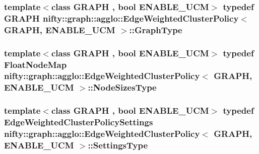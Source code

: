 \subsubsection[{Graph\+Type}]{\setlength{\rightskip}{0pt plus 5cm}template$<$class G\+R\+A\+P\+H , bool E\+N\+A\+B\+L\+E\+\_\+\+U\+C\+M$>$ typedef G\+R\+A\+P\+H {\bf nifty\+::graph\+::agglo\+::\+Edge\+Weighted\+Cluster\+Policy}$<$ G\+R\+A\+P\+H, E\+N\+A\+B\+L\+E\+\_\+\+U\+C\+M $>$\+::{\bf Graph\+Type}}\label{classnifty_1_1graph_1_1agglo_1_1EdgeWeightedClusterPolicy_a8e910f7b9d0c1baa1de7b6b1c3e58397}
\hypertarget{classnifty_1_1graph_1_1agglo_1_1EdgeWeightedClusterPolicy_a44ba54059efcb57c8c8091016fb9ee99}{}
\subsubsection[{Node\+Sizes\+Type}]{\setlength{\rightskip}{0pt plus 5cm}template$<$class G\+R\+A\+P\+H , bool E\+N\+A\+B\+L\+E\+\_\+\+U\+C\+M$>$ typedef Float\+Node\+Map {\bf nifty\+::graph\+::agglo\+::\+Edge\+Weighted\+Cluster\+Policy}$<$ G\+R\+A\+P\+H, E\+N\+A\+B\+L\+E\+\_\+\+U\+C\+M $>$\+::{\bf Node\+Sizes\+Type}}\label{classnifty_1_1graph_1_1agglo_1_1EdgeWeightedClusterPolicy_a44ba54059efcb57c8c8091016fb9ee99}
\hypertarget{classnifty_1_1graph_1_1agglo_1_1EdgeWeightedClusterPolicy_a6c9e2acec086a9fcc4391f067a4ded46}{}
\subsubsection[{Settings\+Type}]{\setlength{\rightskip}{0pt plus 5cm}template$<$class G\+R\+A\+P\+H , bool E\+N\+A\+B\+L\+E\+\_\+\+U\+C\+M$>$ typedef {\bf Edge\+Weighted\+Cluster\+Policy\+Settings} {\bf nifty\+::graph\+::agglo\+::\+Edge\+Weighted\+Cluster\+Policy}$<$ G\+R\+A\+P\+H, E\+N\+A\+B\+L\+E\+\_\+\+U\+C\+M $>$\+::{\bf Settings\+Type}}\label{classnifty_1_1graph_1_1agglo_1_1EdgeWeightedClusterPolicy_a6c9e2acec086a9fcc4391f067a4ded46}


